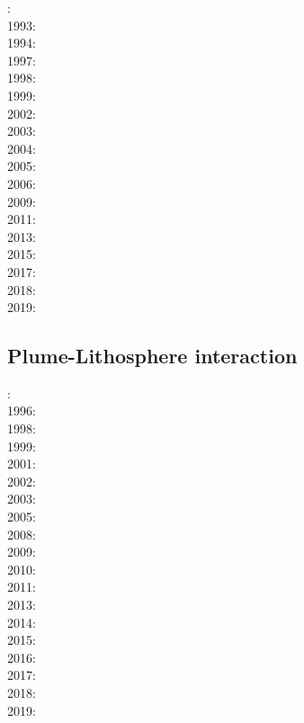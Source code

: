 : \cite{kell91}\\
1993: \cite{keki93}\\
1994: \cite{nasf94}\cite{fari94}\cite{leka94b}\cite{hayu94}\\
1997: \cite{vank97}\cite{keki97}\\
1998: \cite{thta98}\\
1999: \cite{lays99}\\
2002: \cite{falt02}\cite{dagl02}\cite{nitg02}\cite{tagh02}\\
2003: \cite{safa03}\\
2004: \cite{goch04}\\
2005: \cite{tagu05}\\
2006: \cite{isst06}\cite{liva06a}\cite{liva06b}\cite{zhon06}\cite{mita06}\cite{nokm06}\cite{qufo06}\\
2009: \cite{vavl09}\cite{bogj09}\cite{faho09}\\
2011: \cite{toyu11}\cite{talz11}\cite{burk11}\cite{memm11}\cite{dalt11}\cite{tree11}\\
2013: \cite{dagm13}\cite{madd13}\cite{ande13}\\
2015: \cite{daso15}\cite{hafg15}\\
2017: \cite{zhli17}\\
2018: \cite{dacc18}\\
2019: \cite{argc19}

\subsection*{Plume-Lithosphere interaction}

: \cite{rich94}\cite{fari94}\\
1996: \cite{zhgm96}\\
1998: \cite{bisp98}\cite{most98}\\
1999: \cite{most99}\\
2001: \cite{vapy01}\\
2002: \cite{foul02}\\
2003: \cite{vazh03}\\
2005: \cite{bugu05}\cite{fasa05}\\
2008: \cite{uegs08}\cite{slee08}\\
2009: \cite{bucl09}\cite{zhgy09}\cite{baiv10}\cite{tabs09}\\
2010: \cite{fabl10}\\
2011: \cite{sosk11}\\
2013: \cite{bemm12}\cite{brps13}\\
2014: \cite{buge14}\cite{gery14b}\cite{buto14}\cite{buit14}\cite{leli14}\\
2015: \cite{bemm15}\cite{gesb15}\cite{kocb15}\cite{meds15}\cite{lile15}\\
2016: \cite{fige16}\cite{gadb16}\cite{kobc16}\\
2017: \cite{bahf17}\cite{brsg17}\cite{bahf17}\cite{bekb17}\cite{kocb17}\\
2018: \cite{daga18}\\
2019: \cite{kobg19}

